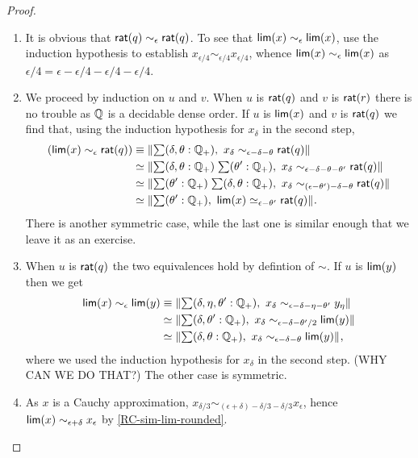 \begin{proof}
  \mbox{}
  \begin{enumerate}

  \item 
    It is obvious that $\mathsf{rat}(q) \sim_\epsilon \mathsf{rat}(q)$. To see that $\mathsf{lim}(x)
    \sim_\epsilon \mathsf{lim}(x)$, use the induction hypothesis to establish $x_{\epsilon/4}
    \sim_{\epsilon/4} x_{\epsilon/4}$, whence $\mathsf{lim}(x) \sim_\epsilon \mathsf{lim}(x)$ as
    $\epsilon/4 = \epsilon - \epsilon/4 - \epsilon/4 - \epsilon/4$.

  \item We proceed by induction on $u$ and $v$. When $u$ is $\mathsf{rat}(q)$ and $v$ is
    $\mathsf{rat}(r)$ there is no trouble as $\mathbb{Q}$ is a decidable dense order. If $u$ is
    $\mathsf{lim}(x)$ and $v$ is $\mathsf{rat}(q)$ we find that, using the induction hypothesis for
    $x_\delta$ in the second step,
    \begin{align*}
      (\rclim(x) \sim_\epsilon \rcrat(q))
      &\jdeq
      \brck{\sm{\delta, \theta : \Qp} x_\delta \sim_{\epsilon - \delta - \theta} \rcrat(q)}
      \\
      &\simeq
      \brck{\sm{\delta, \theta : \Qp}{\theta' : \Qp}
        x_\delta \sim_{\epsilon - \delta - \theta - \theta'} \rcrat(q)}
      \\
      &\simeq
      \brck{\sm{\theta' : \Qp}{\delta, \theta : \Qp}
          x_\delta \sim_{(\epsilon - \theta') - \delta - \theta} \rcrat(q)}
      \\
      &\simeq
      \brck{\sm{\theta' : \Qp} \rclim(x) \simeq_{\epsilon - \theta'} \rcrat(q)}.
    \end{align*}
    There is another symmetric case, while the last one is similar enough that we leave it
    as an exercise.

  \item When $u$ is $\mathsf{rat}(q)$ the two equivalences hold by defintion of $\sim$. If
    $u$ is $\mathsf{lim}(y)$ then we get
    \begin{align*}
      \rclim(x) \sim_\epsilon \rclim(y) &\jdeq
      \brck{\sm{\delta, \eta, \theta' : \Qp}
        x_\delta \sim_{\epsilon - \delta - \eta - \theta'} y_\eta}
      \\
      &\simeq
      \brck{\sm{\delta, \theta' : \Qp}
        x_\delta \sim_{\epsilon - \delta - \theta'/2} \rclim(y)}
      \\
      &\simeq
      \brck{\sm{\delta, \theta : \Qp} x_\delta \sim_{\epsilon - \delta - \theta} \rclim(y)},
    \end{align*}
    where we used the induction hypothesis for $x_\delta$ in the second step. (WHY CAN WE
    DO THAT?) The other case is symmetric.

  \item As $x$ is a Cauchy approximation, $x_{\delta/3} \sim_{(\epsilon + \delta) -
      \delta/3 - \delta/3} x_\epsilon$, hence $\mathsf{lim}(x) \sim_{\epsilon + \delta}
    x_\epsilon$ by \autoref{RC-sim-lim-rounded}.
  \end{enumerate}
\end{proof}

